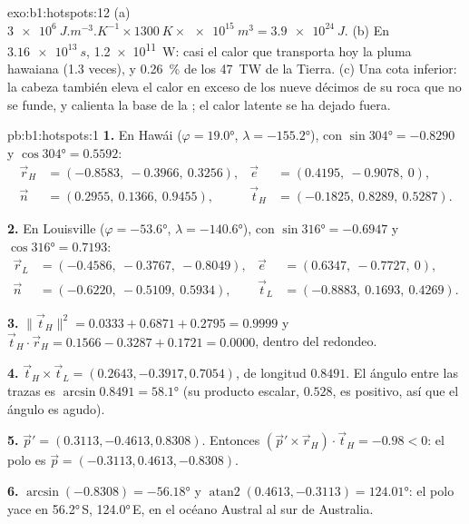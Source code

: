 \begin{solution}{exo:b1:hotspots:12}
(a) $\qty{3e6}{J.m^{-3}.K^{-1}}\times\qty{1300}{K}\times\qty{e15}{m^3} =
\qty{3.9e24}{J}$. (b) En $\qty{3.16e13}{s}$, \qty{1.2e11}{W}: casi el calor que transporta
hoy la pluma hawaiana (1.3 veces), y \qty{0.26}{\percent} de los \qty{47}{TW} de la Tierra. (c) Una cota inferior: la cabeza también
eleva el calor en exceso de los nueve décimos de su roca que no se funde, y calienta la base de la ; el calor latente se ha dejado fuera.
\end{solution}

\begin{solution}{pb:b1:hotspots:1}
\textbf{1.} En Hawái ($\varphi = \ang{19.0}$, $\lambda = \ang{-155.2}$),
con $\sin\ang{304} = -0.8290$ y $\cos\ang{304} = 0.5592$:
\[
\begin{aligned}
  \vec r_H &= (-0.8583,\ -0.3966,\ 0.3256), &
  \vec e &= (0.4195,\ -0.9078,\ 0),\\
  \vec n &= (0.2955,\ 0.1366,\ 0.9455), &
  \vec t_H &= (-0.1825,\ 0.8289,\ 0.5287).
\end{aligned}
\]

\textbf{2.} En Louisville ($\varphi = \ang{-53.6}$, $\lambda = \ang{-140.6}$),
con $\sin\ang{316} = -0.6947$ y $\cos\ang{316} = 0.7193$:
\[
\begin{aligned}
  \vec r_L &= (-0.4586,\ -0.3767,\ -0.8049), &
  \vec e &= (0.6347,\ -0.7727,\ 0),\\
  \vec n &= (-0.6220,\ -0.5109,\ 0.5934), &
  \vec t_L &= (-0.8883,\ 0.1693,\ 0.4269).
\end{aligned}
\]

\textbf{3.} $\lVert\vec t_H\rVert^2 = 0.0333 + 0.6871 + 0.2795 = 0.9999$ y
$\vec t_H\cdot\vec r_H = 0.1566 - 0.3287 + 0.1721 = 0.0000$, dentro del redondeo.

\textbf{4.} $\vec t_H\times\vec t_L = (0.2643, -0.3917, 0.7054)$, de longitud
$0.8491$. El ángulo entre las trazas es $\arcsin0.8491 = \ang{58.1}$ (su producto
escalar, $0.528$, es positivo, así que el ángulo es agudo).

\textbf{5.} $\vec p' = (0.3113, -0.4613, 0.8308)$. Entonces
$(\vec p'\times\vec r_H)\cdot\vec t_H = -0.98 < 0$: el polo es
$\vec p = (-0.3113, 0.4613, -0.8308)$.

\textbf{6.} $\arcsin(-0.8308) = \ang{-56.18}$ y
$\operatorname{atan2}(0.4613, -0.3113) = \ang{124.01}$: el polo yace en
\ang{56.2}\,S, \ang{124.0}\,E, en el océano Austral al sur de Australia.


\end{solution}
